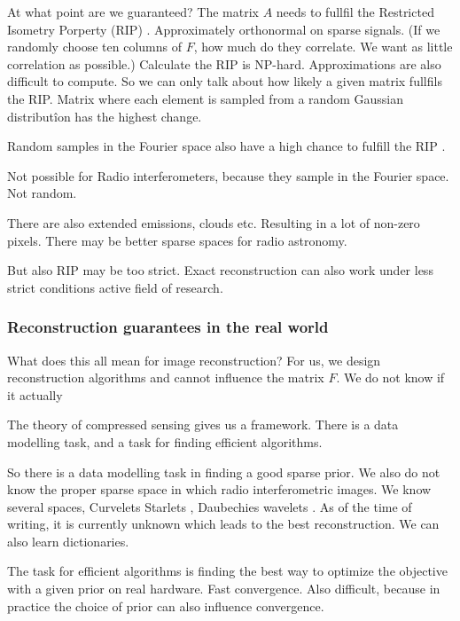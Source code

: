 At what point are we guaranteed? The matrix $A$ needs to fullfil the Restricted Isometry Porperty (RIP) \cite{candes2006robust,donoho2006compressed}.
Approximately orthonormal on sparse signals. (If we randomly choose ten columns of $F$, how much do they correlate. We want as little correlation as possible.)
Calculate the RIP is NP-hard\cite{tillmann2013computational}. Approximations are also difficult to compute\cite{natarajan2014computational}.
So we can only talk about how likely a given matrix fullfils the RIP. Matrix where each element is sampled from a random Gaussian distributîon has the highest change.

Random samples in the Fourier space also have a high chance to fulfill the RIP \cite{haviv2017restricted}.

Not possible for Radio interferometers, because they sample in the Fourier space. Not random.

There are also extended emissions, clouds etc. Resulting in a lot of non-zero pixels. There may be better sparse spaces for radio astronomy.

But also RIP may be too strict. Exact reconstruction can also work under less strict conditions\cite{candes2011probabilistic} active field of research.

\subsubsection{Reconstruction guarantees in the real world}

What does this all mean for image reconstruction?
For us, we design reconstruction algorithms and cannot influence the matrix $F$. We do not know if it actually 

The theory of compressed sensing gives us a framework. There is a data modelling task, and a task for finding efficient algorithms.

So there is a data modelling task in finding a good sparse prior.
We also do not know the proper sparse space in which radio interferometric images. We know several spaces, Curvelets \cite{starck2003astronomical} Starlets \cite{starck2015starlet}, Daubechies wavelets \cite{carrillo2012sparsity}. As of the time of writing, it is currently unknown which leads to the best reconstruction.
We can also learn dictionaries.

The task for efficient algorithms is finding the best way to optimize the objective with a given prior on real hardware. Fast convergence. Also difficult, because in practice the choice of prior can also influence convergence.


